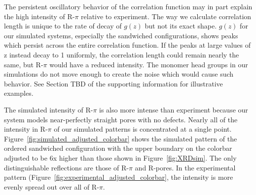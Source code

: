 \documentclass[journal=jpcbfk,manusciprt=article]{achemso}
\begin{document}
  The persistent oscillatory behavior of the correlation function may in part explain the high
  intensity of R-$\pi$ relative to experiment. The way we calculate correlation length is
  unique to the rate of decay of $g(z)$ but not its exact shape. $g(z)$ for our 
  simulated systems, especially the sandwiched configurations, shows peaks which persist across
  the entire correlation function. If the peaks at large values of z instead decay to 1 uniformly,
  the correlation length could remain nearly the same, but R-$\pi$ would have a reduced intensity. 
  The monomer head groups in our simulations do not move enough to create the noise which would 
  cause such behavior. See Section TBD of the supporting information for illustrative examples. 
  
  The simulated intensity of R-$\pi$ is also more intense than experiment because our system
  models near-perfectly straight pores with no defects. Nearly all of the intensity in 
  R-$\pi$ of our simulated patterns is concentrated at a single point. Figure~\ref{fig:simulated_adjusted_colorbar}
  shows the simulated pattern of the ordered sandwiched configuration with the upper boundary
  on the colorbar adjusted to be 6x higher than those shown in Figure~\ref{fig:XRDsim}. The only
  distinguishable reflections are those of R-$\pi$ and R-pores. In the experimental pattern 
  (Figure~\ref{fig:experimental_adjusted_colorbar}, the intensity is more evenly spread out
  over all of R-$\pi$. 
  
\end{document}
